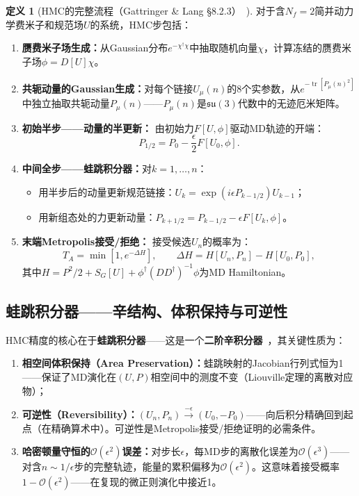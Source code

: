 \documentclass[12pt,a4paper]{ctexart}
\theoremstyle{definition}
\newtheorem{definition}{定义}[section]
\begin{document}
\begin{definition}[HMC的完整流程（Gattringer \& Lang §8.2.3）~\cite{GattringerLang2010}]
对于含$N_f=2$简并动力学费米子和规范场$U$的系统，HMC步包括：

\begin{enumerate}[leftmargin=*]
    \item \textbf{赝费米子场生成：}从Gaussian分布$e^{-\chi^\dagger \chi}$中抽取随机向量$\chi$，计算冻结的赝费米子场$\phi = D[U] \chi$。
    \item \textbf{共轭动量的Gaussian生成：}对每个链接$U_\mu(n)$的8个实参数，从$e^{-\operatorname{tr}[P_\mu(n)^2]}$中独立抽取共轭动量$P_\mu(n)$——$P_\mu(n)$是$\mathfrak{su}(3)$代数中的无迹厄米矩阵。
    \item \textbf{初始半步——动量的半更新：}
    由初始力$F[U,\phi]$驱动MD轨迹的开端：
    \begin{equation*}
    P_{1/2} = P_0 - \frac{\epsilon}{2} F[U_0, \phi].
    \end{equation*}
    \item \textbf{中间全步——蛙跳积分器：}对$k = 1,\dots,n$：
    \begin{itemize}[nosep]
        \item 用半步后的动量更新规范链接：$U_k = \exp(i\epsilon P_{k-1/2}) U_{k-1}$；
        \item 用新组态处的力更新动量：$P_{k+1/2} = P_{k-1/2} - \epsilon F[U_k, \phi]$。
    \end{itemize}
    \item \textbf{末端Metropolis接受/拒绝：}
    接受候选$U_n$的概率为：
    \begin{equation}
    T_A = \min\!\left[1, e^{-\Delta H}\right], \qquad \Delta H = H[U_n, P_n] - H[U_0, P_0],
    \end{equation}
    其中$H = P^2/2 + S_G[U] + \phi^\dagger (DD^\dagger)^{-1}\phi$为MD Hamiltonian。
\end{enumerate}
\end{definition}

\subsection{蛙跳积分器——辛结构、体积保持与可逆性}

HMC精度的核心在于\textbf{蛙跳积分器}——这是一个\textbf{二阶辛积分器}~\cite{GattringerLang2010}，其关键性质为：
\begin{enumerate}[nosep]
    \item \textbf{相空间体积保持（Area Preservation）：}蛙跳映射的Jacobian行列式恒为1——保证了MD演化在$(U,P)$相空间中的测度不变（Liouville定理的离散对应物）；
    \item \textbf{可逆性（Reversibility）：}$(U_n, P_n) \xrightarrow{-\epsilon} (U_0, -P_0)$——向后积分精确回到起点（在精确算术中）。可逆性是Metropolis接受/拒绝证明的必需条件。
    \item \textbf{哈密顿量守恒的$\mathcal{O}(\epsilon^2)$误差：}对步长$\epsilon$，每MD步的离散化误差为$\mathcal{O}(\epsilon^3)$——对含$n \sim 1/\epsilon$步的完整轨迹，能量的累积偏移为$\mathcal{O}(\epsilon^2)$。这意味着接受概率$1 - \mathcal{O}(\epsilon^2)$——在复现的微正则演化中接近1。
\end{enumerate}
\end{document}
